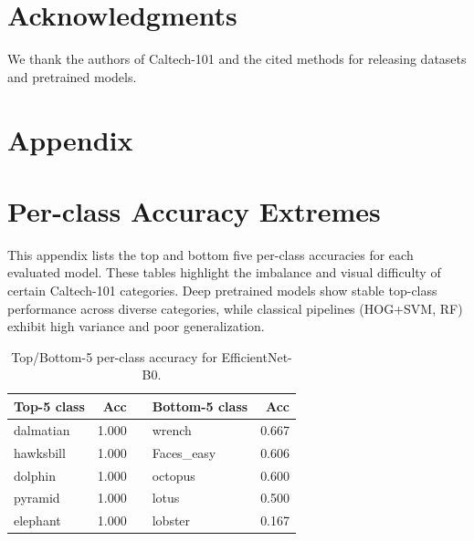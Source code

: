 \documentclass[11pt]{article}
\begin{document}
\section*{Acknowledgments}
We thank the authors of Caltech-101 and the cited methods for releasing datasets and pretrained models.







\FloatBarrier
\clearpage
\appendix
\section*{Appendix}
\section{Per-class Accuracy Extremes}\label{app:perclass}

This appendix lists the top and bottom five per-class accuracies for each evaluated model.
These tables highlight the imbalance and visual difficulty of certain Caltech-101 categories.
Deep pretrained models show stable top-class performance across diverse categories,
while classical pipelines (HOG+SVM, RF) exhibit high variance and poor generalization.

\begin{table}[H]
  \centering
  \begin{tabular}{l r c l r}
    \toprule
    \textbf{Top-5 class} & \textbf{Acc} & & \textbf{Bottom-5 class} & \textbf{Acc}\\
    \midrule
    dalmatian & 1.000 & & wrench & 0.667\\
    hawksbill & 1.000 & & Faces\_easy & 0.606\\
    dolphin & 1.000 & & octopus & 0.600\\
    pyramid & 1.000 & & lotus & 0.500\\
    elephant & 1.000 & & lobster & 0.167\\
    \bottomrule
  \end{tabular}
  \caption{Top/Bottom-5 per-class accuracy for EfficientNet-B0.}
  \label{tab:perclass_effb0_224_adam_cosine_ls05}
\end{table}
\end{document}

